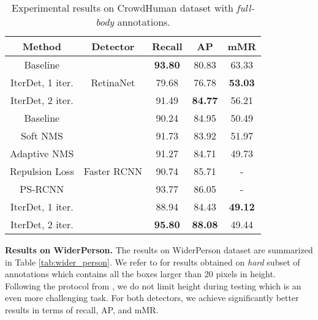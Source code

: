\documentclass[runningheads]{llncs}
\begin{document}
\begin{table*}[h!]
    \centering
    \begin{tabular}{c|c|ccc}
        \hline
        Method & Detector & Recall & AP & mMR  \\ \hline \hline
        Baseline \cite{shao2018crowdhuman} & \multirow{3}{*}{RetinaNet} & \textbf{93.80} & 80.83 & 63.33 \\ \cline{1-1} \cline{3-5}
        IterDet, 1 iter. && 79.68 & 76.78 & \textbf{53.03} \\
        IterDet, 2 iter. && 91.49 & \textbf{84.77} & 56.21 \\ \hline \hline
        Baseline \cite{shao2018crowdhuman} & \multirow{7}{*}{Faster RCNN} & 90.24 & 84.95 & 50.49 \\
        Soft NMS \cite{bodla2017soft,liu2019adaptive} && 91.73 & 83.92 & 51.97 \\
        Adaptive NMS \cite{liu2019adaptive} && 91.27 & 84.71 & 49.73 \\
        Repulsion Loss \cite{wang2017repulsion,ge2020ps} && 90.74 & 85.71 & - \\
        PS-RCNN \cite{ge2020ps} && 93.77 & 86.05& - \\ \cline{1-1} \cline{3-5}
        IterDet, 1 iter. && 88.94 & 84.43 & \textbf{49.12} \\
        IterDet, 2 iter. && \textbf{95.80} & \textbf{88.08} & 49.44 \\ \hline
    \end{tabular}
    \caption{Experimental results on CrowdHuman dataset with \emph{full-body} annotations.}
    \label{tab:crowd_human_full}
\end{table*}

\textbf{Results on WiderPerson.} The results on WiderPerson dataset are summarized in Table \ref{tab:wider_person}. We refer to \cite{zhang2019widerperson} for results obtained on \emph{hard} subset of annotations which contains all the boxes larger than 20 pixels in height. Following the protocol from \cite{ge2020ps}, we do not limit height during testing which is an even more challenging task. For both detectors, we achieve significantly better results in terms of recall, AP, and mMR.
\end{document}
